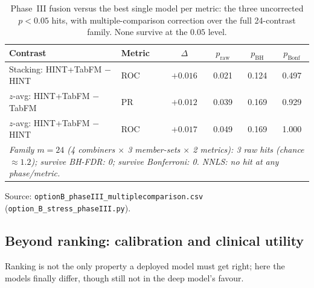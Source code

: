 \documentclass[a4paper,fleqn]{cas-sc}
\begin{document}
\begin{table}[t]
\centering\small
\caption{Phase~III fusion versus the best single model per metric: the three uncorrected
$p<0.05$ hits, with multiple-comparison correction over the full 24-contrast family. None
survive at the $0.05$ level.}
\label{tab:fusioncorr}
\begin{tabular}{llcccc}
\toprule
Contrast & Metric & $\Delta$ & $p_{\text{raw}}$ & $p_{\text{BH}}$ & $p_{\text{Bonf}}$ \\
\midrule
Stacking: HINT+TabFM $-$ HINT & ROC & $+0.016$ & 0.021 & 0.124 & 0.497 \\
$z$-avg: HINT+TabFM $-$ TabFM & PR & $+0.012$ & 0.039 & 0.169 & 0.929 \\
$z$-avg: HINT+TabFM $-$ HINT & ROC & $+0.017$ & 0.049 & 0.169 & 1.000 \\
\midrule
\multicolumn{6}{p{.92\linewidth}}{\emph{Family $m{=}24$ (4 combiners $\times$ 3 member-sets $\times$ 2 metrics): 3 raw hits (chance $\approx1.2$); survive BH-FDR: 0; survive Bonferroni: 0. NNLS: no hit at any phase/metric.}}\\
\bottomrule
\end{tabular}
\begin{minipage}{\linewidth}\vspace{2pt}\scriptsize Source: \texttt{optionB\_phaseIII\_multiplecomparison.csv} (\texttt{option\_B\_stress\_phaseIII.py}). \end{minipage}
\end{table}
\subsection{Beyond ranking: calibration and clinical utility}
Ranking is not the only property a deployed model must get right; here the models finally differ, though still not in the deep model's favour.
\end{document}
